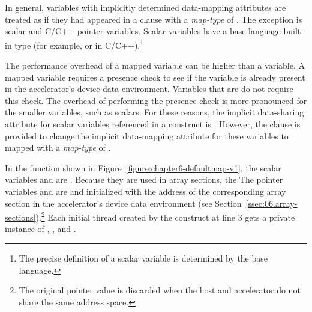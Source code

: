 In general, variables with implicitly determined data-mapping attributes are
treated as if they had appeared in a  clause with a \emph{map-type}
of .  The exception is scalar and C/C++ pointer variables.
Scalar variables have a base language built-in type (for example,  or
 in C/C++).\footnote{The precise definition of a scalar variable is
determined by the base language.}  

The performance overhead of a mapped variable can be higher than a 
variable.  A mapped variable requires a presence check to see if the variable
is already present in the accelerator's device data environment.
Variables that are  do not require this check.  
The overhead of performing the presence
check is more pronounced for the smaller variables, such as scalars.  For these reasons,
the implicit data-sharing attribute for scalar variables referenced in a
 construct is .  However, the
 clause is provided to change the implicit
data-mapping attribute for these variables to mapped with a \emph{map-type} of
.


In the  function shown in Figure~\ref{figure:chapter6-defaultmap-v1}, the
scalar variables  and  are .  
Because they are used in array sections, the
The pointer variables  and
 are  and initialized with the address of the corresponding
array section in the accelerator's device data environment
(see Section~\ref{ssec:06.array-sections}).\footnote{The original
pointer value is discarded when the host and accelerator do not share the same address space.}
Each initial thread created by the
 construct at line $3$ gets a private instance of , ,
 and .  

